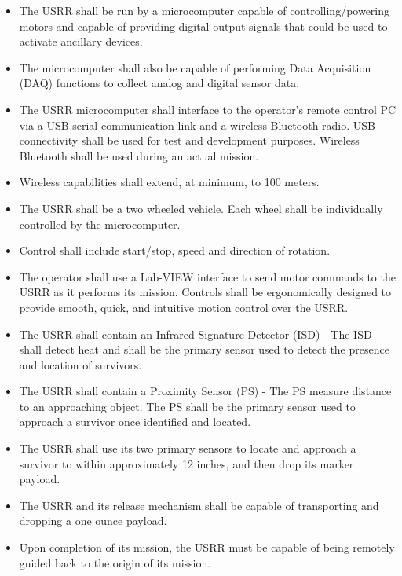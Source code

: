 \documentclass{article}
\begin{document}
    \begin{itemize}
    \item The USRR shall be run by a microcomputer capable of controlling/powering motors and capable of providing digital output signals that could be used to activate ancillary devices. 
    \item The microcomputer shall also be capable of performing Data Acquisition (DAQ) functions to collect analog and digital sensor data.
    \item The USRR microcomputer shall interface to the operator’s remote control PC via a USB serial communication link and a wireless Bluetooth radio. USB connectivity shall be used for test and development purposes.  Wireless Bluetooth shall be used during an actual mission.
    \item Wireless capabilities shall extend, at minimum, to 100 meters.
    \item The USRR shall be a two wheeled vehicle.  Each wheel shall be individually controlled by the microcomputer.
    \item Control shall include start/stop, speed and direction of rotation.
    \item The operator shall use a Lab-VIEW interface to send motor commands to the USRR as it performs its mission. Controls shall be ergonomically designed to provide smooth, quick, and intuitive motion control over the USRR. 
    \item The USRR shall contain an Infrared Signature Detector (ISD) - The ISD shall detect heat and shall be the primary sensor used to detect the presence and location of survivors.
    \item The USRR shall contain a Proximity Sensor (PS) - The PS measure distance to an approaching object. The PS shall be the primary sensor used to approach a survivor once identified and located.
    \item The USRR shall use its two primary sensors to locate and approach a survivor to within approximately 12 inches, and then drop its marker payload.
    \item  The USRR and its release mechanism shall be capable of transporting and dropping a one ounce payload.
    \item Upon completion of its mission, the USRR must be capable of being remotely guided back to the origin of its mission.
\end{itemize}
\newpage
\end{document}
